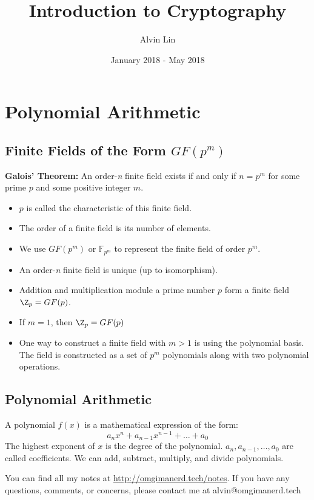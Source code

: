 \documentclass{math}
\title{Introduction to Cryptography}
\author{Alvin Lin}
\date{January 2018 - May 2018}
\begin{document}
\maketitle

\section*{Polynomial Arithmetic}

\subsection*{Finite Fields of the Form \( GF(p^m) \)}
\textbf{Galois' Theorem:} An order-\textit{n} finite field exists if and only if
\( n = p^m \) for some prime \( p \) and some positive integer \( m \).
\begin{itemize}
  \item \( p \) is called the characteristic of this finite field.
  \item The order of a finite field is its number of elements.
  \item We use \( GF(p^m) \) or \( \mathbb{F}_{p^m} \) to represent the finite
  field of order \( p^m \).
  \item An order-\textit{n} finite field is unique (up to isomorphism).
  \item Addition and multiplication module a prime number \( p \) form a finite
  field \( \Z_p = GF(p) \).
  \item If \( m = 1 \), then \( \Z_p = GF(p) \)
  \item One way to construct a finite field with \( m > 1 \) is using the
  polynomial basis. The field is constructed as a set of \( p^m \) polynomials
  along with two polynomial operations.
\end{itemize}

\subsection*{Polynomial Arithmetic}
A polynomial \( f(x) \) is a mathematical expression of the form:
\[ a_nx^n+a_{n-1}x^{n-1}+\dots+a_0 \]
The highest exponent of \( x \) is the degree of the polynomial. \( a_n,
a_{n-1}, \dots, a_0 \) are called coefficients. We can add, subtract, multiply,
and divide polynomials.

\begin{center}
  You can find all my notes at \url{http://omgimanerd.tech/notes}. If you have
  any questions, comments, or concerns, please contact me at
  alvin@omgimanerd.tech
\end{center}
\end{document}

